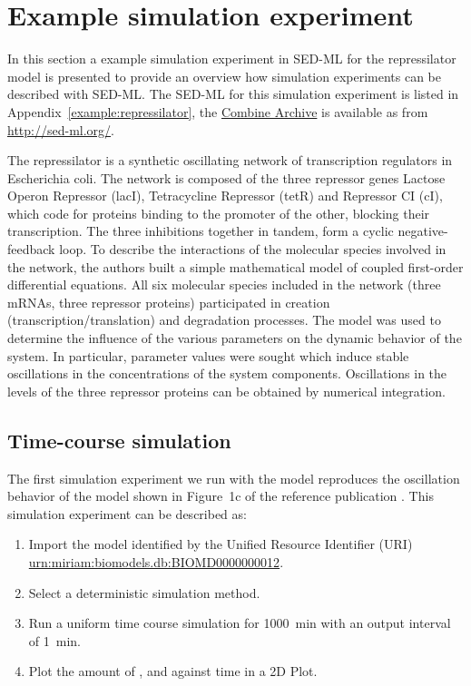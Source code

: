 \section{Example simulation experiment}
\label{motivation:example}
In this section a example simulation experiment in SED-ML for the repressilator model \citep{Elowitz:2000} is presented to provide an overview how simulation experiments can be described with SED-ML. The SED-ML for this simulation experiment is listed in Appendix~\ref{example:repressilator}, the \hyperref[sec:archive]{Combine Archive} is available as  from \url{http://sed-ml.org/}.

The repressilator is a synthetic oscillating network of transcription regulators in Escherichia coli. The network is composed of the three repressor genes Lactose Operon Repressor (lacI), Tetracycline Repressor (tetR) and Repressor CI (cI), which code for proteins binding to the promoter of the other, blocking their transcription. The three inhibitions together in tandem, form a cyclic negative-feedback loop. To describe the interactions of the molecular species involved in the network, the authors built a simple mathematical model of coupled first-order differential equations. All six molecular species included in the network (three mRNAs, three repressor proteins) participated in creation (transcription/translation) and degradation processes. The model was used to determine the influence of the various parameters on the dynamic behavior of the system. In particular, parameter values were sought which induce stable oscillations in the concentrations of the system components. Oscillations in the levels of the three repressor proteins can be obtained by numerical integration. 

\subsection{Time-course simulation}
\label{sec:timecourse}
The first simulation experiment we run with the model reproduces the oscillation behavior of the model shown in Figure~1c of the reference publication \citep{Elowitz:2000}. This simulation experiment can be described as:

\begin{enumerate}
 	\item{Import the model identified by the Unified Resource Identifier (URI) \citep{Berners-Lee:2005}\\ 	\url{urn:miriam:biomodels.db:BIOMD0000000012}.}
 	\item {Select a deterministic simulation method.}
 	\item{Run a uniform time course simulation for 1000~min with an output interval of 1~min.}
 	\item{Plot the amount of ,  and  against time in a 2D Plot.}
 \end{enumerate}

